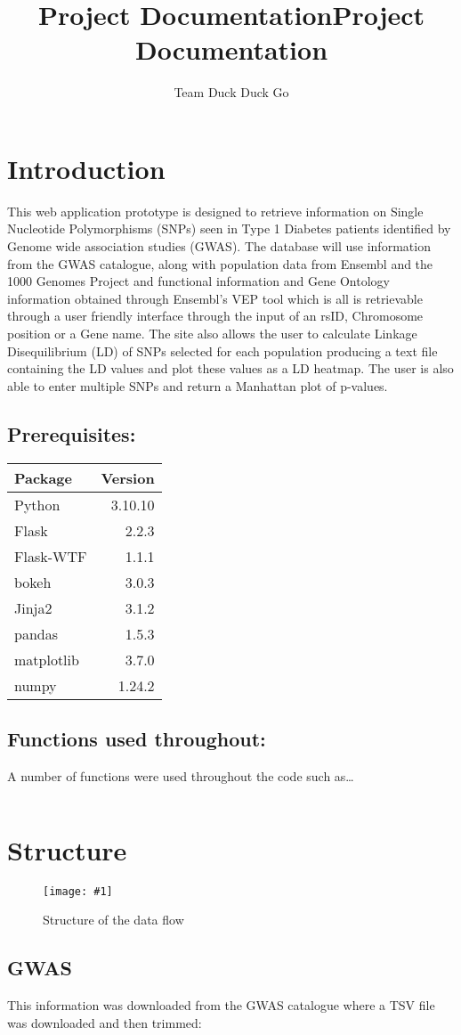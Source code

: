 \documentclass[12pt,a4paper]{article}
\title{Project Documentation}
\title{\huge \textbf{Project Documentation}}
\author{Team Duck Duck Go}
\date{} 					%
\newcommand{\mintfile}[1]{
\begin{tcolorbox}[colback=gray!5!white,%
	grow to left by=20mm,
    grow to right by=20mm,
    sharp corners]{{    \small \inputminted[breaklines]{python}{#1}		}}
\end{tcolorbox}}
\newcommand{\sect}[1]{
\clearpage
\hypertarget{#1}{
\section{#1}\label{#1}}
}
\newcommand{\subsect}[1]{
\FloatBarrier %
\hypertarget{#1}{
\subsection{#1}\label{#1}}
}
\newcommand{\subsubsect}[1]{
\hypertarget{#1}{
\subsection{#1}\label{#1}}
}
\newcommand{\pic}[2]{
\begin{figure}[h]
    \centering
    \captionsetup{justification=centering}
    \texttt{[image: \#1]}
    \caption{#2}
    \label{#1}
\end{figure}
}
\begin{document}
\maketitle
\thispagestyle{empty}
\clearpage
\tableofcontents
\clearpage

\sect{Introduction}


This web application prototype is designed to retrieve information on Single Nucleotide Polymorphisms
(SNPs) seen in Type 1 Diabetes patients identified by Genome wide association studies (GWAS).
The database will use information from the GWAS catalogue, along with population data from Ensembl
and the 1000 Genomes Project and functional information and Gene Ontology information obtained through
Ensembl’s VEP tool which is all is retrievable through a user friendly interface through the input of an rsID,
Chromosome position or a Gene name. The site also allows the user to calculate Linkage Disequilibrium (LD)
of SNPs selected for each population producing a text file containing the LD values and plot these values as
a LD heatmap. The user is also able to enter multiple SNPs and return a Manhattan plot of p-values.

\subsect{Prerequisites:}

\begin{tabular}{l r}
Package & Version \\
\hline
Python & 3.10.10 \\
Flask&2.2.3 \\
Flask-WTF&1.1.1 \\
bokeh&3.0.3 \\
Jinja2&3.1.2 \\
pandas&1.5.3 \\
matplotlib&3.7.0 \\
numpy&1.24.2 \\
\end{tabular}

\subsubsect{Functions used throughout:}

A number of functions were used throughout the code such as\ldots{}

\mintfile{code_snippets/placeholder.py}

\sect{Structure}
\pic{structure}{Structure of the data flow}

\subsect{GWAS}

This information was downloaded from the GWAS catalogue where a TSV file was downloaded and then trimmed:
\end{document}

